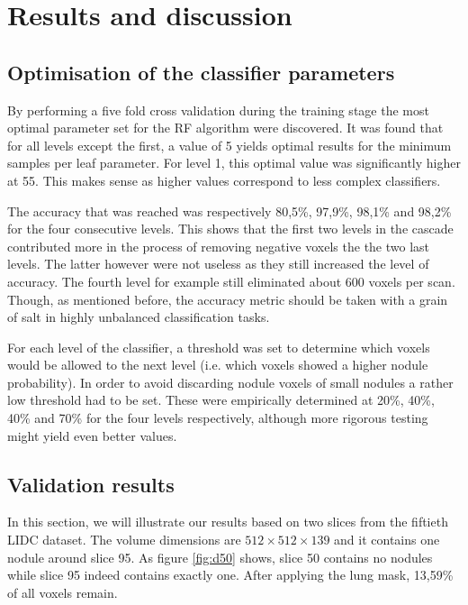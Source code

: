 \section{Results and discussion}
\subsection{Optimisation of the classifier parameters}
By performing a five fold cross validation during the training stage the most
optimal parameter set for the RF algorithm were discovered. It was found that
for all levels except the first, a value of 5 yields optimal results for the
minimum samples per leaf parameter. For level 1, this optimal value was
significantly higher at 55. This makes sense as higher values correspond to less
complex classifiers.

The accuracy that was reached was respectively 80,5\%, 97,9\%, 98,1\% and 98,2\%
for the four consecutive levels. This shows that the first two levels in the
cascade contributed more in the process of removing negative voxels the the two
last levels. The latter however were not useless as they still increased the
level of accuracy. The fourth level for example still eliminated about 600
voxels per scan. Though, as mentioned before, the accuracy metric should be taken
with a grain of salt in highly unbalanced classification tasks.

For each level of the classifier, a threshold was set to determine which voxels
would be allowed to the next level (i.e. which voxels showed a higher nodule
probability). In order to avoid discarding nodule voxels of small nodules a
rather low threshold had to be set. These were empirically determined at 20\%,
40\%, 40\% and 70\% for the four levels respectively, although more rigorous
testing might yield even better values.

\subsection{Validation results}
In this section, we will illustrate our results based on two slices from the
fiftieth LIDC dataset. The volume dimensions are $512 \times 512\times 139$ and
it contains one nodule around slice 95. As figure \ref{fig:d50} shows, slice 50
contains no nodules while slice 95 indeed contains exactly one. After applying
the lung mask, 13,59\% of all voxels remain.

